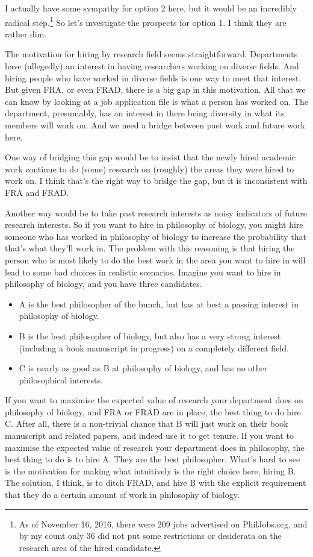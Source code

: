 \documentclass[
  11pt,
  letterpaper,
  DIV=11,
  numbers=noendperiod,
  twoside]{scrartcl}
\providecommand{\tightlist}{%
  \setlength{\itemsep}{0pt}\setlength{\parskip}{0pt}}
\begin{document}
I actually have some sympathy for option 2 here, but it would be an
incredibly radical step.\footnote{As of November 16, 2016, there were
  209 jobs advertised on PhilJobs.org, and by my count only 36 did not
  put some restrictions or desiderata on the research area of the hired
  candidate.} So let's investigate the prospects for option 1. I think
they are rather dim.

The motivation for hiring by research field seems straightforward.
Departments have (allegedly) an interest in having researchers working
on diverse fields. And hiring people who have worked in diverse fields
is one way to meet that interest. But given FRA, or even FRAD, there is
a big gap in this motivation. All that we can know by looking at a job
application file is what a person has worked on. The department,
presumably, has an interest in there being diversity in what its members
will work on. And we need a bridge between past work and future work
here.

One way of bridging this gap would be to insist that the newly hired
academic work continue to do (some) research on (roughly) the areas they
were hired to work on. I think that's the right way to bridge the gap,
but it is inconsistent with FRA and FRAD.

Another way would be to take past research interests as noisy indicators
of future research interests. So if you want to hire in philosophy of
biology, you might hire someone who has worked in philosophy of biology
to increase the probability that that's what they'll work in. The
problem with this reasoning is that hiring the person who is most likely
to do the best work in the area you want to hire in will lead to some
bad choices in realistic scenarios. Imagine you want to hire in
philosophy of biology, and you have three candidates.

\begin{itemize}
\tightlist
\item
  A is the best philosopher of the bunch, but has at best a passing
  interest in philosophy of biology.
\item
  B is the best philosopher of biology, but also has a very strong
  interest (including a book manuscript in progress) on a completely
  different field.
\item
  C is nearly as good as B at philosophy of biology, and has no other
  philosophical interests.
\end{itemize}

If you want to maximise the expected value of research your department
does on philosophy of biology, and FRA or FRAD are in place, the best
thing to do hire C. After all, there is a non-trivial chance that B will
just work on their book manuscript and related papers, and indeed use it
to get tenure. If you want to maximise the expected value of research
your department does in philosophy, the best thing to do is to hire A.
They are the best philosopher. What's hard to see is the motivation for
making what intuitively is the right choice here, hiring B. The
solution, I think, is to ditch FRAD, and hire B with the explicit
requirement that they do a certain amount of work in philosophy of
biology.
\end{document}
